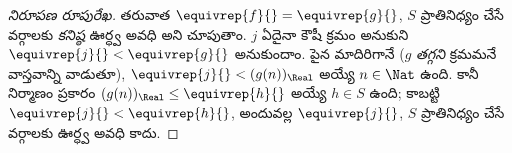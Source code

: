 \documentclass[../../../include/open-logic-section]{subfiles}
\begin{document}
\begin{proof}[నిరూపణ రూపురేఖ]
తరువాత $\equivrep{f}{} = \equivrep{g}{}$, $S$ ప్రాతినిధ్యం చేసే
వర్గాలకు \emph{కనిష్ఠ} ఊర్ధ్వ అవధి అని చూపుతాం. $j$ ఏదైనా కౌషీ క్రమం
అనుకుని $\equivrep{j}{} < \equivrep{g}{}$ అనుకుందాం. పైన మాదిరిగానే
($g$ \emph{తగ్గని} క్రమమనే వాస్తవాన్ని వాడుతూ),
$\equivrep{j}{} < (g(n))_\Real$ అయ్యే $n \in \Nat$ ఉంది. కానీ
నిర్మాణం ప్రకారం $(g(n))_\Real \leq \equivrep{h}{}$ అయ్యే
$h \in S$ ఉంది; కాబట్టి $\equivrep{j}{} < \equivrep{h}{}$,
అందువల్ల $\equivrep{j}{}$, $S$ ప్రాతినిధ్యం చేసే వర్గాలకు ఊర్ధ్వ
అవధి కాదు.
\end{proof}
\end{document}
